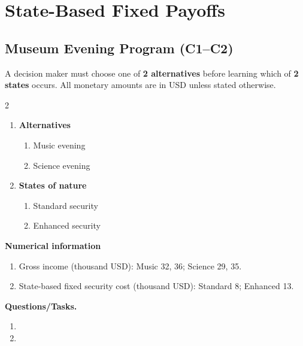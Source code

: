 \section{State-Based Fixed Payoffs}
\label{sec:state-based-fixed-payoffs}
\subsection{Museum Evening Program (C1--C2)}
\label{sec:problem7-museum-evening-program-c1-c2}
A decision maker must choose one of \textbf{2 alternatives} before learning which of \textbf{2 states} occurs. All monetary amounts are in USD unless stated otherwise.
\begin{multicols}{2}
\begin{enumerate}[label=\arabic*.]
 \item \textbf{Alternatives}
 \begin{enumerate}[label=\roman*)]
  \item Music evening
  \item Science evening
 \end{enumerate}
 \item \textbf{States of nature}
 \begin{enumerate}[label=\roman*)]
  \item Standard security
  \item Enhanced security
 \end{enumerate}
\end{enumerate}
\end{multicols}
 \textbf{Numerical information}
 \begin{enumerate}[label=\roman*)]
  \item Gross income (thousand USD): Music 32, 36; Science 29, 35.
  \item State-based fixed security cost (thousand USD): Standard 8; Enhanced 13.
 \end{enumerate}


\textbf{Questions/Tasks.}
\begin{enumerate}[label=\textbf{\alph*)}]
 \item {}
 \item {}
\end{enumerate}

